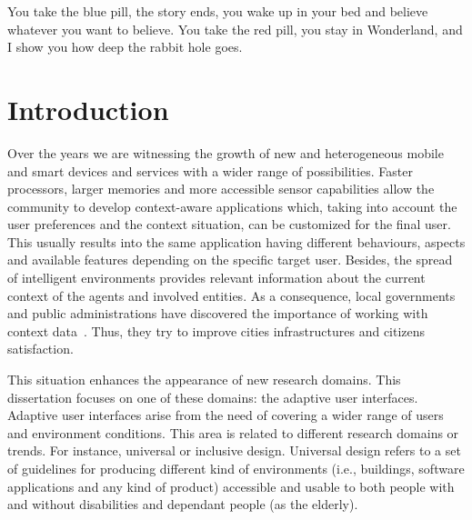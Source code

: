\begin{savequote}[50mm]
You take the blue pill, the story ends, you wake up in your bed and believe 
whatever you want to believe. You take the red pill, you stay in Wonderland, 
and I show you how deep the rabbit hole goes.
\end{savequote}

\chapter{Introduction}
\label{cha:introduction}

\ifpdf
    \graphicspath{{1_introduction/figures/PNG/}{1_introduction/figures/PDF/}{1_introduction/figures/}}
\else
    \graphicspath{{1_introduction/figures/EPS/}{1_introduction/figures/}}
\fi


Over the years we are witnessing the growth of new and heterogeneous mobile and
smart devices and services with a wider range of possibilities. Faster processors,
larger memories and more accessible sensor capabilities allow the community to
develop context-aware applications which, taking into account the user preferences
and the context situation, can be customized for the final user. This usually
results into the same application having different behaviours, aspects and 
available features depending on the specific target user. Besides, the spread 
of intelligent environments provides relevant information about the current 
context of the agents and involved entities. As a consequence, local 
governments and public administrations have discovered the importance of 
working with context data~\citep{caragliu_smart_2009}. Thus, they try to 
improve cities infrastructures and citizens satisfaction.

This situation enhances the appearance of new research domains. This 
dissertation focuses on one of these domains: the adaptive user interfaces. 
Adaptive user interfaces arise from the need of covering a wider range of users 
and environment conditions. This area is related to different research domains 
or trends. For instance, universal or inclusive design. Universal design refers 
to a set of guidelines for producing different kind of environments (i.e., 
buildings, software applications and any kind of product) accessible and usable 
to both people with and without disabilities and dependant people (as the 
elderly).

